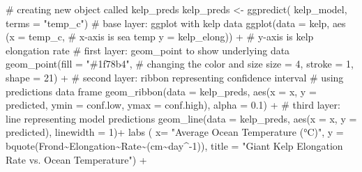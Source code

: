 \documentclass[
  letterpaper,
  DIV=11,
  numbers=noendperiod]{scrartcl}
\newenvironment{Shaded}{\begin{snugshade}}{\end{snugshade}}
\newcommand{\AttributeTok}[1]{\textcolor[rgb]{0.40,0.45,0.13}{#1}}
\newcommand{\CommentTok}[1]{\textcolor[rgb]{0.37,0.37,0.37}{#1}}
\newcommand{\DecValTok}[1]{\textcolor[rgb]{0.68,0.00,0.00}{#1}}
\newcommand{\FloatTok}[1]{\textcolor[rgb]{0.68,0.00,0.00}{#1}}
\newcommand{\FunctionTok}[1]{\textcolor[rgb]{0.28,0.35,0.67}{#1}}
\newcommand{\NormalTok}[1]{\textcolor[rgb]{0.00,0.23,0.31}{#1}}
\newcommand{\OtherTok}[1]{\textcolor[rgb]{0.00,0.23,0.31}{#1}}
\newcommand{\SpecialCharTok}[1]{\textcolor[rgb]{0.37,0.37,0.37}{#1}}
\newcommand{\StringTok}[1]{\textcolor[rgb]{0.13,0.47,0.30}{#1}}
\begin{document}
\begin{Shaded}
\begin{Highlighting}[]
\CommentTok{\# creating new object called kelp\_preds}
\NormalTok{kelp\_preds }\OtherTok{\textless{}{-}} \FunctionTok{ggpredict}\NormalTok{(}
\NormalTok{  kelp\_model, }
  \AttributeTok{terms =} \StringTok{"temp\_c"}\NormalTok{)}
\CommentTok{\# base layer: ggplot with kelp data}
\FunctionTok{ggplot}\NormalTok{(}\AttributeTok{data =}\NormalTok{ kelp, }
       \FunctionTok{aes}\NormalTok{ (}\AttributeTok{x =}\NormalTok{ temp\_c, }\CommentTok{\# x{-}axis is sea temp}
            \AttributeTok{y =}\NormalTok{ kelp\_elong)) }\SpecialCharTok{+} \CommentTok{\# y{-}axis is kelp elongation rate}
  \CommentTok{\# first layer: geom\_point to show underlying data}
  \FunctionTok{geom\_point}\NormalTok{(}\AttributeTok{fill =} \StringTok{"\#1f78b4"}\NormalTok{, }\CommentTok{\# changing the color and size}
             \AttributeTok{size =} \DecValTok{4}\NormalTok{, }
             \AttributeTok{stroke =} \DecValTok{1}\NormalTok{,}
             \AttributeTok{shape =} \DecValTok{21}\NormalTok{) }\SpecialCharTok{+} 
 \CommentTok{\# second layer: ribbon representing confidence interval}
 \CommentTok{\# using predictions data frame}
 \FunctionTok{geom\_ribbon}\NormalTok{(}\AttributeTok{data =}\NormalTok{ kelp\_preds,}
             \FunctionTok{aes}\NormalTok{(}\AttributeTok{x =}\NormalTok{ x,}
                 \AttributeTok{y =}\NormalTok{ predicted, }
                 \AttributeTok{ymin =}\NormalTok{ conf.low,}
                 \AttributeTok{ymax =}\NormalTok{ conf.high),}
             \AttributeTok{alpha =} \FloatTok{0.1}\NormalTok{) }\SpecialCharTok{+}
  \CommentTok{\# third layer: line representing model predictions}
  \FunctionTok{geom\_line}\NormalTok{(}\AttributeTok{data =}\NormalTok{ kelp\_preds,}
            \FunctionTok{aes}\NormalTok{(}\AttributeTok{x =}\NormalTok{ x,}
                \AttributeTok{y =}\NormalTok{ predicted),}
            \AttributeTok{linewidth =} \DecValTok{1}\NormalTok{)}\SpecialCharTok{+}
   \FunctionTok{labs}\NormalTok{ ( }\AttributeTok{x=} \StringTok{"Average Ocean Temperature (°C)"}\NormalTok{,}
         \AttributeTok{y =} \FunctionTok{bquote}\NormalTok{(Frond}\SpecialCharTok{\textasciitilde{}}\NormalTok{Elongation}\SpecialCharTok{\textasciitilde{}}\NormalTok{Rate}\SpecialCharTok{\textasciitilde{}}\NormalTok{(cm}\SpecialCharTok{\textasciitilde{}}\NormalTok{day}\SpecialCharTok{\^{}{-}}\DecValTok{1}\NormalTok{)),}
                    \AttributeTok{title =} \StringTok{"Giant Kelp Elongation Rate vs. Ocean Temperature"}\NormalTok{) }\SpecialCharTok{+}

\end{Highlighting}
\end{Shaded}
\end{document}
